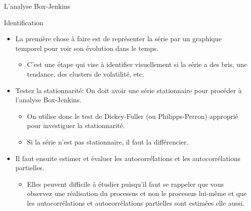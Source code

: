 \documentclass{beamer}
\begin{document}
\begin{frame}{L’analyse Box-Jenkins}
\begin{block}{Identification}
\begin{itemize}
\item La première chose à faire est de représenter la série par un graphique temporel pour voir son évolution dans le temps. 
\begin{itemize}
\item C’est une étape qui vise à identifier visuellement si la série a des bris, une tendance, des clusters de volatilité, etc.
\end{itemize}
\item Testez la stationnarité: On doit avoir une série stationnaire pour procéder à l’analyse Box-Jenkins. 
\begin{itemize}
\item On utilise donc le test de Dickey-Fuller (ou Philipps-Perron) approprié pour investiguer la stationnarité. 
\item Si la série n’est pas stationnaire, il faut la différencier. 
\end{itemize}
\item Il faut ensuite estimer et évaluer les autocorrélations et les autocorrélations partielles. 
\begin{itemize}
\item Elles peuvent difficile à étudier puisqu’il faut se rappeler que vous observez une réalisation du processus et non le processus lui-même et que les autocorrélations et autocorrélations partielles sont estimées elle aussi. 
\end{itemize}
\end{itemize}
\end{block}
\end{frame}
\end{document}
